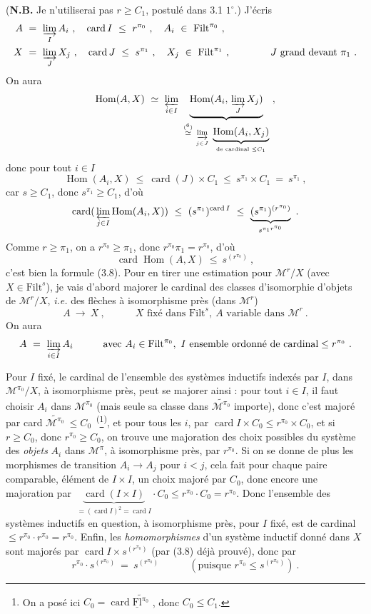 \documentclass[11pt]{article}
\newcommand{\printedpage}[1]{\marginpar{\footnotesize p.~#1}}
\newcommand{\msp}[1]{\marginpar{\footnotesize [#1]}}
\newcommand{\M}{\mathcal{M}}
\newcommand{\uFl}{\underline{\mathrm{Fl}}}
\newcommand{\Filt}{\mathrm{Filt}}
\newcommand{\card}{\operatorname{card}}
\newcommand{\Hom}{\operatorname{Hom}}
\newcommand{\wavy}[1]{\widetilde{#1}}
\begin{document}
(\textbf{N.B.} Je n'utiliserai pas $r\geq C_1$, postulé dans 3.1 $1^\circ$.) J'écris
\[
\begin{aligned}
A\ &=\ \varinjlim_I A_i\ ,\quad \card I\ \leq\ r^{\pi_0}\ ,\quad A_i\ \in\ \Filt^{\pi_0}\ ,\\
X\ &=\ \varinjlim_J X_j\ ,\quad \card J\ \leq\ s^{\pi_1}\ ,\quad X_j\ \in\ \Filt^{\pi_1}\ ,\qquad\qquad J\text{ grand devant }\pi_1\ .
\end{aligned}
\]
On aura
\[
\Hom(A,X)\ \simeq\ \varprojlim_{i\in I}\ \underbrace{\Hom(A_i,\,\varinjlim_J X_j)}_{\overset{(\text{\footnotemark[6]})}{\simeq}\ \varinjlim\limits_{j\in J}\ \underbrace{\Hom(A_i,X_j)}_{\text{de cardinal }\leq C_1}}\ ,
\]
\footnotetext[6]{car les $A\in\Filt^{\pi_0}$ sont $\pi_1$-accessibles.}
donc pour tout $i\in I$
\[
\Hom(A_i,X)\ \leq\ \card(J)\times C_1\ \leq\ s^{\pi_1}\times C_1\ =\ s^{\pi_1}\ ,
\]
car $s\geq C_1$, donc $s^{\pi_1}\geq C_1$, d'où
\[
\card(\,\varprojlim_{j\in I}\Hom(A_i,X))\ \leq\ (s^{\pi_1})^{\card I}\ \leq\ \underbrace{(s^{\pi_1})^{(r^{\pi_0})}}_{s^{\pi_1 r^{\pi_0}}}\ . %
\]
Comme $r\geq\pi_1$, on a $r^{\pi_0}\geq\pi_1$, donc $r^{\pi_0}\pi_1=r^{\pi_0}$, d'où
\[
\card\Hom(A,X)\ \leq\ s^{(r^{\pi_0})}\ ,
\]
c'est bien la formule (3.8). Pour en tirer une estimation pour $\M^r/X$ (avec $X\in\Filt^s$), \msp{page 21} je vais d'abord majorer le cardinal des classes d'isomorphie d'objets de $\M^r/X$, \textit{i.e.} des flèches à isomorphisme près (dans $\M^r$)
\[
A\ \longrightarrow\ X\ ,\qquad\quad X\text{ fixé dans }\Filt^s,\ A\text{ variable dans }\M^r\ .
\]
On aura
\[
A\ =\ \varinjlim_{i\in I} A_i\qquad\quad\text{avec } A_i\in\Filt^{\pi_0},\ I\text{ ensemble ordonné de cardinal}\leq r^{\pi_0}\ .
\]

\printedpage{15}
Pour $I$ fixé, le cardinal de l'ensemble des systèmes inductifs indexés par $I$, dans $\M^{\pi_0}/X$, à isomorphisme près, peut se majorer ainsi : pour tout $i\in I$, il faut choisir $A_i$ dans $\M^{\pi_0}$ (mais seule sa classe dans $\wavy{\M^{\pi_0}}$ importe), donc c'est majoré par card $\wavy{\M^{\pi_0}}\ \leq C_0$~\textsuperscript{(}\footnote[7]{On a posé ici $C_0=\card\wavy{\uFl^{\pi_0}}$ , donc $C_0\leq C_1$.}\textsuperscript{)}, et pour tous les $i$, par $\card I\times C_0\leq r^{\pi_0}\times C_0$, et si $r\geq C_0$, donc $r^{\pi_0}\geq C_0$, on trouve une majoration des choix possibles du système des \textit{objets} $A_i$ dans $\M^\pi$, à isomorphisme près, par $r^{\pi_0}$. Si on se donne de plus les morphismes de transition $A_i\longrightarrow A_j$ pour $i<j$, cela fait pour chaque paire comparable, élément de $I\times I$, un choix majoré par $C_0$, donc encore une majoration par $\ \underbrace{\card(I\times I)}_{=(\card I)^2=\card I}\cdot C_0\leq r^{\pi_0}\cdot C_0=r^{\pi_0}$. Donc l'ensemble des systèmes inductifs en question, à isomorphisme près, pour $I$ fixé, est de cardinal $\leq r^{\pi_0}\cdot r^{\pi_0}=r^{\pi_0}$. Enfin, les \textit{homomorphismes} d'un système inductif donné dans $X$ sont majorés par $\card I\times s^{(r^{\pi_0})}$ (par (3.8) déjà prouvé), donc par
\[
r^{\pi_0}\cdot s^{(r^{\pi_0})}\ =\ s^{(r^{\pi_0})}\qquad\quad(\text{puisque } r^{\pi_0}\leq s^{(r^{\pi_0})})\ .
\]
\end{document}
